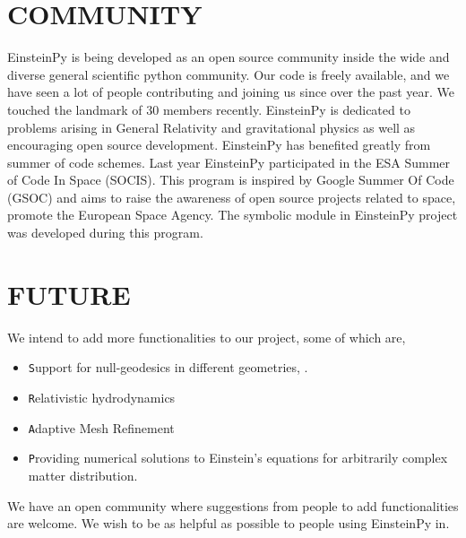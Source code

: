 \documentclass{aastex63}
\begin{document}
\section{COMMUNITY} \label{sec:COMMUNITY}
EinsteinPy is being developed as an open source community inside the wide and diverse general scientific python community. Our code is freely available, and we have seen a lot of people contributing and joining us since over the past year.
We touched the landmark of 30 members recently. EinsteinPy is dedicated to problems arising in General Relativity and gravitational physics as well as encouraging open source development. EinsteinPy has benefited greatly from summer of code schemes. Last year EinsteinPy participated in the ESA Summer of Code In Space (SOCIS). This program is inspired by Google Summer Of Code (GSOC) and aims to raise the awareness of open source projects related to space, promote the European Space Agency. The symbolic module in EinsteinPy project was developed during this program.

\section{FUTURE} \label{sec:FUTURE}
We intend to add more functionalities to our project, some of which are, 
\begin{itemize}
\item \texttt Support for null-geodesics in different geometries, . 
\item \texttt Relativistic hydrodynamics
\item \texttt Adaptive Mesh Refinement 
\item \texttt Providing numerical solutions to Einstein’s equations for arbitrarily complex matter distribution.
\end{itemize}

We have an open community where suggestions from people to add functionalities are welcome. We wish to be as helpful as possible to people using EinsteinPy in.
\end{document}
